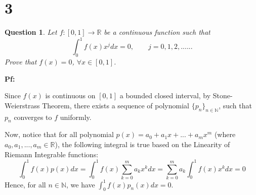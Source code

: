 \documentclass{article}
\newtheorem{question}{Question}
\begin{document}
\begin{comment}
\hfill

\textbf{Sequence of Polynomials Converging to $f^{(3)}$ and $f^{(2)}$:}

Given that $f^{(3)}$ is continuous on $[0,1]$, then by Stone-Weierstrass Theorem, there exists a sequence of polynomial $\{p_n\}_{n\in\mathbb{N}}$ that converges uniformly to $f^{(3)}$.
Which, for all $n\in\mathbb{N}$, let $p_{1,n}:[0,1]\rightarrow\mathbb{R}$ be an antiderivative of $p_n$ that satisfies $p_{1,n}(0) = f''(0)$. 

Then, since $p_{1,n}' = p_n$ converges to $(f'')' = f^{(3)}$, and $\lim_{n\rightarrow\infty}p_{1,n}(0) = \lim_{n\rightarrow\infty}f''(0) = f''(0)$,
then we can conclude that $p_{1,n}$ must converge to $f''$ uniformly (since the derivatives converge uniformly to the derivative of $f''$, and there is a point converging to $f''$).

\hfill

\textbf{Sequence of Polynomials Converging to the other Functions:}
\end{comment}

\break

\section*{3}
\begin{myBox}[]{}
    \begin{question}
        Let $f:[0,1]\rightarrow\mathbb{R}$ be a continuous function such that
        $$\int_{0}^{1}f(x)x^jdx = 0,\quad\quad j=0,1,2,......$$
        Prove that $f(x)=0$, $\forall x\in[0,1]$.
    \end{question}
\end{myBox}

\textbf{Pf:}

Since $f(x)$ is continuous on $[0,1]$ a bounded closed interval, by Stone-Weierstrass Theorem, there exists a sequence of polynomial $\{p_n\}_{n\in\mathbb{N}}$, such that $p_n$ converges to $f$ uniformly.

Now, notice that for all polynomial $p(x)=a_0+a_1x+...+a_mx^m$ (where $a_0,a_1,...,a_m\in\mathbb{R}$), the following integral is true based on the Linearity of Riemann Integrable functions:
$$\int_{0}^{1}f(x)p(x)dx = \int_{0}^{1}f(x)\sum_{k=0}^{m}a_kx^kdx = \sum_{k=0}^{m}a_k\int_{0}^{1}f(x)x^kdx = 0$$
Hence, for all $n\in\mathbb{N}$, we have $\int_{0}^{1}f(x)p_n(x)dx = 0$.

\hfill
\end{document}
